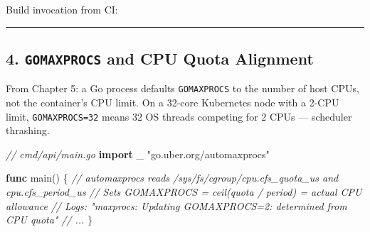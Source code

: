 \documentclass[
]{article}
\newenvironment{Shaded}{}{}
\newcommand{\AttributeTok}[1]{\textcolor[rgb]{0.49,0.56,0.16}{#1}}
\newcommand{\CommentTok}[1]{\textcolor[rgb]{0.38,0.63,0.69}{\textit{#1}}}
\newcommand{\DataTypeTok}[1]{\textcolor[rgb]{0.56,0.13,0.00}{#1}}
\newcommand{\ExtensionTok}[1]{#1}
\newcommand{\FunctionTok}[1]{\textcolor[rgb]{0.02,0.16,0.49}{#1}}
\newcommand{\KeywordTok}[1]{\textcolor[rgb]{0.00,0.44,0.13}{\textbf{#1}}}
\newcommand{\NormalTok}[1]{#1}
\newcommand{\OperatorTok}[1]{\textcolor[rgb]{0.40,0.40,0.40}{#1}}
\newcommand{\StringTok}[1]{\textcolor[rgb]{0.25,0.44,0.63}{#1}}
\newcommand{\VariableTok}[1]{\textcolor[rgb]{0.10,0.09,0.49}{#1}}
\begin{document}
Build invocation from CI:

\begin{Shaded}
\end{Shaded}

\begin{center}\rule{0.5\linewidth}{0.5pt}\end{center}

\hypertarget{gomaxprocs-and-cpu-quota-alignment}{%
\subsection{\texorpdfstring{4. \texttt{GOMAXPROCS} and CPU Quota
Alignment}{4. GOMAXPROCS and CPU Quota Alignment}}\label{gomaxprocs-and-cpu-quota-alignment}}

From Chapter 5: a Go process defaults \texttt{GOMAXPROCS} to the number
of host CPUs, not the container's CPU limit. On a 32-core Kubernetes
node with a 2-CPU limit, \texttt{GOMAXPROCS=32} means 32 OS threads
competing for 2 CPUs --- scheduler thrashing.

\begin{Shaded}
\begin{Highlighting}[]
\CommentTok{// cmd/api/main.go}
\KeywordTok{import}\NormalTok{ \_ }\StringTok{"go.uber.org/automaxprocs"}

\KeywordTok{func}\NormalTok{ main}\OperatorTok{()} \OperatorTok{\{}
    \CommentTok{// automaxprocs reads /sys/fs/cgroup/cpu.cfs\_quota\_us and cpu.cfs\_period\_us}
    \CommentTok{// Sets GOMAXPROCS = ceil(quota / period) = actual CPU allowance}
    \CommentTok{// Logs: "maxprocs: Updating GOMAXPROCS=2: determined from CPU quota"}
    \CommentTok{// ...}
\OperatorTok{\}}
\end{Highlighting}
\end{Shaded}
\end{document}
